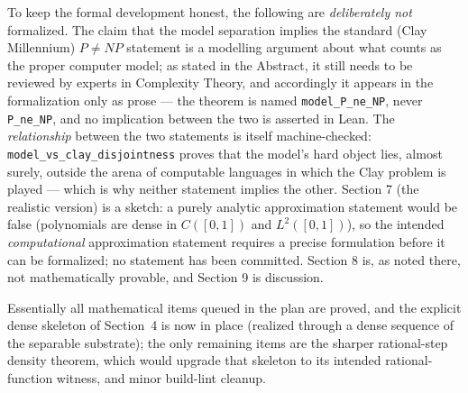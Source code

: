 \documentclass[11pt,a4paper]{report}
\begin{document}
To keep the formal development honest, the following are
\emph{deliberately not} formalized. The claim that the model separation
implies the standard (Clay Millennium) \(P \neq NP\) statement is a
modelling argument about what counts as the proper computer model; as
stated in the Abstract, it still needs to be reviewed by experts in
Complexity Theory, and accordingly it appears in the formalization only
as prose --- the theorem is named \texttt{model\_P\_ne\_NP}, never
\texttt{P\_ne\_NP}, and no implication between the two is asserted in
Lean. The \emph{relationship} between the two statements is itself
machine-checked: \texttt{model\_vs\_clay\_disjointness} proves that the
model's hard object lies, almost surely, outside the arena of computable
languages in which the Clay problem is played --- which is why neither
statement implies the other. Section 7 (the realistic version) is a
sketch: a purely analytic
approximation statement would be false (polynomials are dense in
\(C([0,1])\) and \(L^{2}([0,1])\)), so the intended
\emph{computational} approximation statement requires a precise
formulation before it can be formalized; no statement has been committed.
Section 8 is, as noted there, not mathematically provable, and Section 9
is discussion.

Essentially all mathematical items queued in the plan are proved, and the
explicit dense skeleton of Section~4 is now in place (realized through a dense
sequence of the separable substrate); the only remaining items are the sharper
rational-step density theorem, which would upgrade that skeleton to its intended
rational-function witness, and minor build-lint cleanup.
\end{document}
